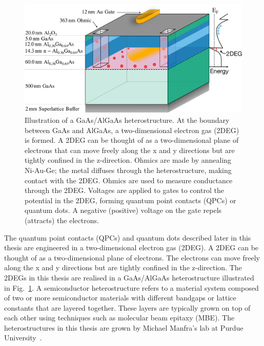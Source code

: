 \begin{figure}[!htb]
 \begin{center}
 \includegraphics[width=1.0\textwidth]{figures/ch1/figure2.pdf}
 \caption[GaAs/AlGaAs Heterostructure]{\label{fig:ch1/2Deg} 
 Illustration of a GaAs/AlGaAs heterostructure. At the boundary between GaAs and AlGaAs, a two-dimensional electron gas (2DEG) is formed. A 2DEG can be thought of as a two-dimensional plane of electrons that can move freely along the x and y directions but are tightly confined in the z-direction. Ohmics are made by annealing Ni-Au-Ge; the metal diffuses through the heterostructure, making contact with the 2DEG. Ohmics are used to measure conductance through the 2DEG. Voltages are applied to gates to control the potential in the 2DEG, forming quantum point contacts (QPCs) or quantum dots. A negative (positive) voltage on the gate repels (attracts) the electrons.
 }
 \end{center}
\end{figure}



The quantum point contacts (QPCs) and quantum dots described later in this thesis are engineered in a two-dimensional electron gas (2DEG). A 2DEG can be thought of as a two-dimensional plane of electrons. The electrons can move freely along the x and y directions but are tightly confined in the z-direction. The 2DEGs in this thesis are realised in a GaAs/AlGaAs heterostructure illustrated in Fig.~\ref{fig:ch1/2Deg}. A semiconductor heterostructure refers to a material system composed of two or more semiconductor materials with different bandgaps or lattice constants that are layered together. These layers are typically grown on top of each other using techniques such as molecular beam epitaxy (MBE). The heterostructures in this thesis are grown by Michael Manfra's lab at Purdue University~\cite{manfra_high_quality}. 

